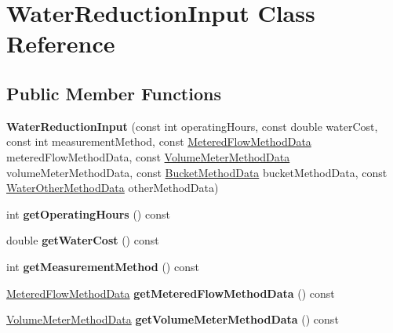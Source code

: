 \hypertarget{class_water_reduction_input}{}\section{Water\+Reduction\+Input Class Reference}
\label{class_water_reduction_input}
\subsection*{Public Member Functions}
\begin{DoxyCompactItemize}
\item 
\mbox{\label{class_water_reduction_input_a3dca4a54390c3138ffb370b6f2cb042a}} 
{\bfseries Water\+Reduction\+Input} (const int operating\+Hours, const double water\+Cost, const int measurement\+Method, const \hyperlink{class_metered_flow_method_data}{Metered\+Flow\+Method\+Data} metered\+Flow\+Method\+Data, const \hyperlink{class_volume_meter_method_data}{Volume\+Meter\+Method\+Data} volume\+Meter\+Method\+Data, const \hyperlink{class_bucket_method_data}{Bucket\+Method\+Data} bucket\+Method\+Data, const \hyperlink{class_water_other_method_data}{Water\+Other\+Method\+Data} other\+Method\+Data)
\item 
\mbox{\label{class_water_reduction_input_a5729d714bc997517ddd5c2cb669342bf}} 
int {\bfseries get\+Operating\+Hours} () const
\item 
\mbox{\label{class_water_reduction_input_abc82bf5deda166af87b8c1e4282a8551}} 
double {\bfseries get\+Water\+Cost} () const
\item 
\mbox{\label{class_water_reduction_input_ac35bb3e183348ece8e5b7a4d1fbc9e0f}} 
int {\bfseries get\+Measurement\+Method} () const
\item 
\mbox{\label{class_water_reduction_input_ac60726af81042d3ccab564b4592379f5}} 
\hyperlink{class_metered_flow_method_data}{Metered\+Flow\+Method\+Data} {\bfseries get\+Metered\+Flow\+Method\+Data} () const
\item 
\mbox{\label{class_water_reduction_input_ace98f845b1eea761820edc1d41931528}} 
\hyperlink{class_volume_meter_method_data}{Volume\+Meter\+Method\+Data} {\bfseries get\+Volume\+Meter\+Method\+Data} () const

\end{DoxyCompactItemize}
